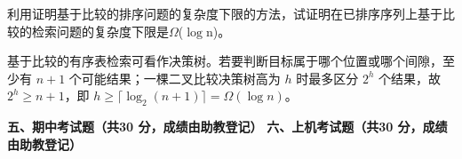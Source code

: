 \begin{question}[4 分]
利用证明基于比较的排序问题的复杂度下限的方法，试证明在已排序序列上基于比较的检索问题的复杂度下限是$\Omega$($\log$n)。

\begin{solution}
基于比较的有序表检索可看作决策树。若要判断目标属于哪个位置或哪个间隙，至少有 $n+1$ 个可能结果；一棵二叉比较决策树高为 $h$ 时最多区分 $2^h$ 个结果，故 $2^h\ge n+1$，即 $h\ge\lceil\log_2(n+1)\rceil=\Omega(\log n)$。
\end{solution}
\end{question}

\textbf{五、期中考试题（共30 分，成绩由助教登记）}
\textbf{六、上机考试题（共30 分，成绩由助教登记）}
